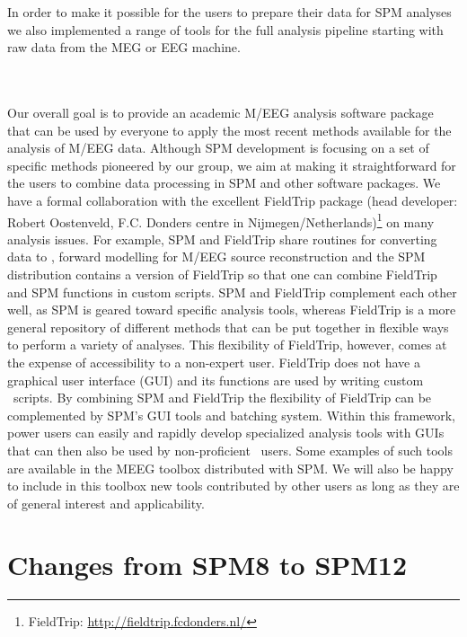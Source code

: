 In order to make it possible for the users to prepare their data for SPM analyses we also implemented a range of tools for the full analysis pipeline starting with raw data from the MEG or EEG machine.

\\
\\
Our overall goal is to provide an academic M/EEG analysis software package that can be used by everyone to apply the most recent methods available for the analysis of M/EEG data. Although SPM development is focusing on a set of specific methods pioneered by our group, we aim at making it straightforward for the users to combine data processing in SPM and other software packages. We have a formal collaboration with the excellent FieldTrip package (head developer: Robert Oostenveld, F.C. Donders centre in Nijmegen/Netherlands)\footnote{FieldTrip: \url{http://fieldtrip.fcdonders.nl/}} on many analysis issues. For example, SPM and FieldTrip share routines for converting data to \matlab, forward modelling for M/EEG source reconstruction and the SPM distribution contains a version of FieldTrip so that one can combine FieldTrip and SPM functions in custom scripts. SPM and FieldTrip complement each other well, as SPM is geared toward specific analysis tools, whereas FieldTrip is a more general repository of different methods that can be put together in flexible ways to perform a variety of analyses. This flexibility of FieldTrip, however, comes at the expense of accessibility to a non-expert user. FieldTrip does not have a graphical user interface (GUI) and its functions are used by writing custom \matlab\ scripts. By combining SPM and FieldTrip the flexibility of FieldTrip can be complemented by SPM's GUI tools and batching system. Within this framework, power users can easily and rapidly develop specialized analysis tools with GUIs that can then  also be used by non-proficient \matlab\ users. Some examples of such tools are available in the MEEG toolbox distributed with SPM. We will also be happy to include in this toolbox new tools contributed by other users as long as they are of general interest and applicability. 

\section{Changes from SPM8 to SPM12}

